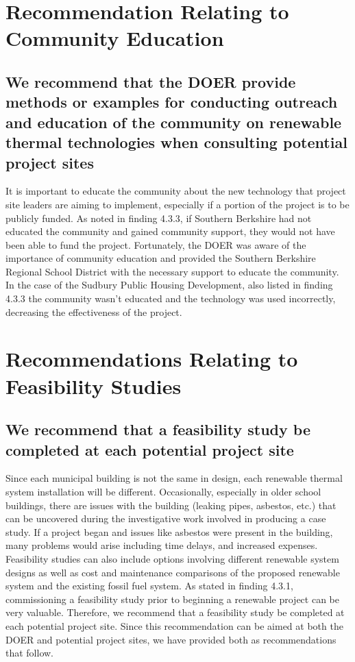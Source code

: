\section{Recommendation Relating to Community Education} 
\subsection{We recommend that the DOER provide methods or examples for conducting outreach and education of the community on renewable thermal technologies when consulting potential project sites}
It is important to educate the community about the new technology that project site leaders are aiming to implement, especially if a portion of the project is to be publicly funded. As noted in finding 4.3.3, if Southern Berkshire had not educated the community and gained community support, they would not have been able to fund the project. Fortunately, the DOER was aware of the importance of community education and provided the Southern Berkshire Regional School District with the necessary support to educate the community. In the case of the Sudbury Public Housing Development, also listed in finding 4.3.3 the community wasn’t educated and the technology was used incorrectly, decreasing the effectiveness of the project. 

\section{Recommendations Relating to Feasibility Studies}
\subsection{We recommend that a feasibility study be completed at each potential project site}
\par Since each municipal building is not the same in design, each renewable thermal system installation will be different. Occasionally, especially in older school buildings, there are issues with the building (leaking pipes, asbestos, etc.) that can be uncovered during the investigative work involved in producing a case study. If a project began and issues like asbestos were present in the building, many problems would arise including time delays, and increased expenses. Feasibility studies can also include options involving different renewable system designs as well as cost and maintenance comparisons of the proposed renewable system and the existing fossil fuel system. As stated in finding 4.3.1, commissioning a feasibility study prior to beginning a renewable project can be very valuable. Therefore, we recommend that a feasibility study be completed at each potential project site. Since this recommendation can be aimed at both the DOER and potential project sites, we have provided both as recommendations that follow.


